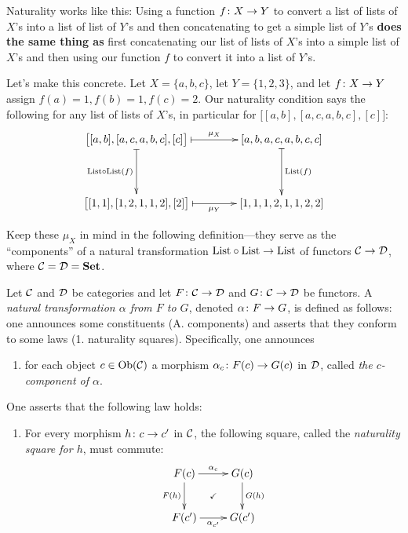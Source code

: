 \begin{slogan}
Naturality works like this: Using a function $f\colon X\rightarrow Y$ to convert a list of lists of $X$'s into a list of list of $Y$'s and then concatenating to get a simple list of $Y$'s {\bf does the same thing as} first concatenating our list of lists of $X$'s into a simple list of $X$'s and then using our function $f$ to convert it into a list of $Y$'s.
\end{slogan}

Let's make this concrete. Let $X=\{a,b,c\}$, let $Y=\{1,2,3\}$, and let $f\colon X\rightarrow Y$ assign $f(a)=1, f(b)=1, f(c)=2$. Our naturality condition says the following for any list of lists of $X$'s, in particular for $\big[[a,b],[a,c,a,b,c],[c]\big]$:
$$\xymatrix@=40pt{
\big[[a,b],[a,c,a,b,c],[c]\big]\ar@{|->}[r]^-{\mu_X}\ar@{|->}[d]_{\List\circ\List(f)}&[a,b,a,c,a,b,c,c]\ar@{|->}[d]^{\List(f)}\\
\big[[1,1],[1,2,1,1,2],[2]\big]\ar@{|->}[r]_-{\mu_Y}&[1,1,1,2,1,1,2,2]
}
$$

Keep these $\mu_X$ in mind in the following definition—they serve as the “components” of a natural transformation $\textnormal{List}\circ\textnormal{List}\rightarrow\textnormal{List}$ of functors $\mathcal{C}\rightarrow\mathcal{D}$, where $\mathcal{C}=\mathcal{D}={\bf Set}$.

\begin{definition}\label{def:natural transformation}

Let $\mathcal{C}$ and $\mathcal{D}$ be categories and let $F\colon\mathcal{C}\rightarrow\mathcal{D}$ and $G\colon\mathcal{C}\rightarrow\mathcal{D}$ be functors. A {\em natural transformation $\alpha$ from $F$ to $G$}, denoted $\alpha\colon F\rightarrow G$, is defined as follows: one announces some constituents (A. components) and asserts that they conform to some laws (1. naturality squares). Specifically, one announces
\begin{enumerate}[\hsp A.]
\item for each object $c\in\textnormal{Ob}(\mathcal{C})$ a morphism $\alpha_c\colon F(c)\rightarrow G(c)$ in $\mathcal{D}$, called {\em the $c$-component of $\alpha$}.
\end{enumerate}
One asserts that the following law holds:
\begin{enumerate}[\hsp 1.]
\item For every morphism $h\colon c\rightarrow c'$ in $\mathcal{C}$, the following square, called the {\em naturality square for $h$}, must commute:
\begin{align}\label{dia:naturality square}
\xymatrix{F(c)\ar@{}[dr]|{\checkmark}\ar[d]_{F(h)}\ar[r]^{\alpha_c}&G(c)\ar[d]^{G(h)}\\F(c')\ar[r]_{\alpha_{c'}}&G(c')}
\end{align}
\end{enumerate}

\end{definition}

